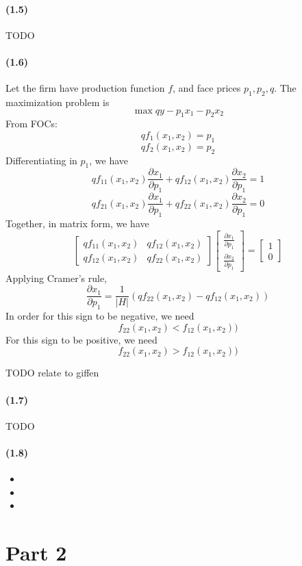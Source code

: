 \documentclass[10pt,letter]{article}
\begin{document}
\paragraph{(1.5)}
TODO
\paragraph{(1.6)}
Let the firm have production function $f$, and face prices $p_1, p_2, q$. The maximization problem is
\[ \max qy - p_1 x_1 - p_2 x_2 \]
From FOCs:
\[ qf_1(x_1, x_2) = p_1 \]
\[ qf_2(x_1, x_2) = p_2 \]
Differentiating in $p_1$, we have
\[ qf_{11}(x_1, x_2) \frac{\partial x_1}{\partial p_1} + qf_{12}(x_1, x_2) \frac{\partial x_2}{\partial p_1} = 1 \]
\[ qf_{21}(x_1, x_2) \frac{\partial x_1}{\partial p_1} + qf_{22}(x_1, x_2) \frac{\partial x_2}{\partial p_1} = 0 \]
Together, in matrix form, we have
\[ \begin{bmatrix}
qf_{11}(x_1, x_2) & qf_{12}(x_1, x_2) \\
qf_{12}(x_1, x_2) & qf_{22}(x_1, x_2)
\end{bmatrix} \begin{bmatrix} \frac{\partial x_1}{\partial p_1} \\ \frac{\partial x_2}{\partial p_1}\end{bmatrix} = \begin{bmatrix} 1 \\ 0 \end{bmatrix} \]
Applying Cramer's rule,
\[ \frac{\partial x_1}{\partial p_1} = \frac{1}{|H|} (qf_{22}(x_1, x_2) - qf_{12}(x_1, x_2)) \]
In order for this sign to be negative, we need
\[ f_{22}(x_1, x_2) < f_{12}(x_1, x_2)) \]
For this sign to be positive, we need
\[ f_{22}(x_1, x_2) > f_{12}(x_1, x_2)) \]

TODO relate to giffen
\paragraph{(1.7)}
TODO
\paragraph{(1.8)}
\begin{itemize}
\item
\item
\item
\end{itemize}
\pagebreak
\section*{Part 2}
\end{document}
